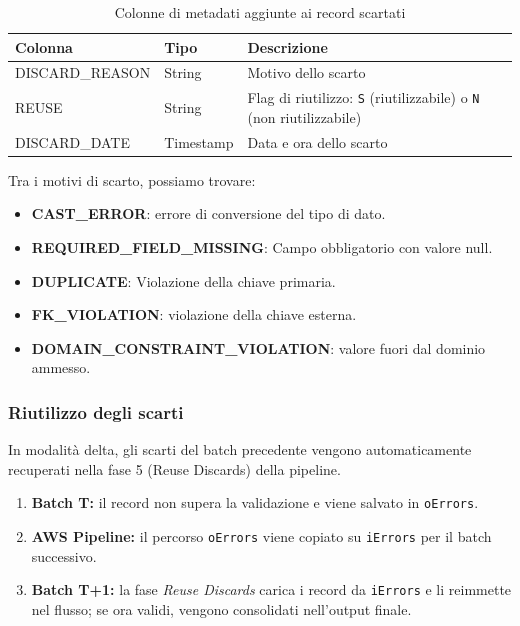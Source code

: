 \documentclass[12pt,a4paper,openright,twoside]{book}
\begin{document}
\begin{table}[H]
\centering\small
\begin{tabularx}{\textwidth}{>{\ttfamily}l l X}
\toprule
\normalfont\textbf{Colonna} & \textbf{Tipo} & \textbf{Descrizione} \\
\midrule
DISCARD\_REASON & String    & Motivo dello scarto \\
REUSE           & String    & Flag di riutilizzo: \texttt{S} (riutilizzabile) o \texttt{N} (non riutilizzabile) \\
DISCARD\_DATE   & Timestamp & Data e ora dello scarto \\
\bottomrule
\end{tabularx}
\caption{Colonne di metadati aggiunte ai record scartati}
\label{tab:scarto-metadati}
\end{table}

Tra i motivi di scarto, possiamo trovare:
\begin{itemize}
    \item \textbf{CAST\_ERROR}: errore di conversione del tipo di dato.
    \item \textbf{REQUIRED\_FIELD\_MISSING}: Campo obbligatorio con valore null.
    \item \textbf{DUPLICATE}: Violazione della chiave primaria.
    \item \textbf{FK\_VIOLATION}: violazione della chiave esterna.
    \item \textbf{DOMAIN\_CONSTRAINT\_VIOLATION}: valore fuori dal dominio ammesso.
\end{itemize}

\subsubsection{Riutilizzo degli scarti}
In modalità delta, gli scarti del batch precedente vengono automaticamente recuperati nella fase 5 (Reuse Discards) della pipeline. 

\begin{enumerate}
    \item \textbf{Batch T:} il record non supera la validazione e viene salvato in \texttt{oErrors}.
    \item \textbf{AWS Pipeline:} il percorso \texttt{oErrors} viene copiato su \texttt{iErrors} per il batch successivo.
    \item \textbf{Batch T+1:} la fase \emph{Reuse Discards} carica i record da \texttt{iErrors} e li reimmette nel flusso; se ora validi, vengono consolidati nell'output finale.
\end{enumerate}
\end{document}
